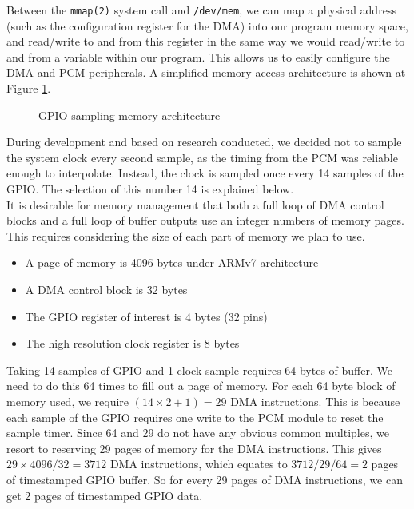 \documentclass[capstone_report.tex]{subfiles}
\begin{document}
    Between the \texttt{mmap(2)} system call and \texttt{/dev/mem}, we can map a physical address (such as the configuration register for the DMA) into our program memory space, and read/write to and from this register in the same way we would read/write to and from a variable within our program. This allows us to easily configure the DMA and PCM peripherals. A simplified memory access architecture is shown at Figure \ref{fig:dma2}.

    \begin{figure}[H]
    \centering
        
        \caption{GPIO sampling memory architecture\label{fig:dma2}}
    \end{figure}

    During development and based on research conducted, we decided not to sample the system clock every second sample, as the timing from the PCM was reliable enough to interpolate. Instead, the clock is sampled once every 14 samples of the GPIO. The selection of this number 14 is explained below. \\

    It is desirable for memory management that both a full loop of DMA control blocks and a full loop of buffer outputs use an integer numbers of memory pages. This requires considering the size of each part of memory we plan to use.

    \begin{itemize}
        \item A page of memory is 4096 bytes under ARMv7 architecture
        \item A DMA control block is 32 bytes
        \item The GPIO register of interest is 4 bytes (32 pins)
        \item The high resolution clock register is 8 bytes
    \end{itemize}

    Taking 14 samples of GPIO and 1 clock sample requires 64 bytes of buffer. We need to do this 64 times to fill out a page of memory. For each 64 byte block of memory used, we require $(14\times2+1) = 29$ DMA instructions. This is because each sample of the GPIO requires one write to the PCM module to reset the sample timer. Since 64 and 29 do not have any obvious common multiples, we resort to reserving 29 pages of memory for the DMA instructions. This gives $29\times 4096 / 32 = 3712$ DMA instructions, which equates to $3712/29/64=2$ pages of timestamped GPIO buffer. So for every 29 pages of DMA instructions, we can get 2 pages of timestamped GPIO data. \\
\end{document}
